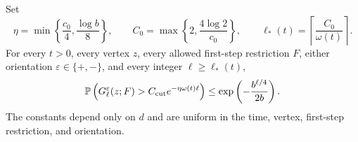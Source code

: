 \begin{proposition}
\label{prop:path-average}
Set
\[
 \eta=\min\left\{\frac{c_0}{4},\frac{\log b}{8}\right\},\qquad
 C_0=\max\left\{2,\frac{4\log2}{c_0}\right\},\qquad
 \ell_*(t)=\left\lceil\frac{C_0}{\omega(t)}\right\rceil.
\]
For every $t>0$, every vertex $z$, every allowed first-step restriction
$F$, either orientation $\varepsilon\in\{+,-\}$, and every integer
$\ell\ge\ell_*(t)$,
\begin{equation}
 \P\left(G^\varepsilon_\ell(z;F)
       >C_{\mathrm{cut}}e^{-\eta\omega(t)\ell}\right)
       \le\exp\left(-\frac{b^{\ell/4}}{2b}\right).
 \label{eq:double-exp}
\end{equation}
The constants depend only on $d$ and are uniform in the time, vertex,
first-step restriction, and orientation.
\end{proposition}

